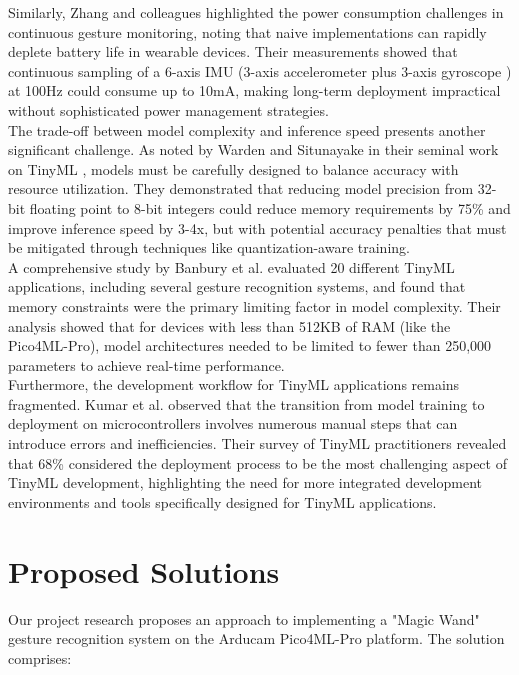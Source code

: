 Similarly, Zhang and colleagues \cite{Fan:2023} highlighted the power consumption challenges in continuous gesture monitoring, noting that naive implementations can rapidly deplete battery life in wearable devices. Their measurements showed that continuous sampling of a 6-axis IMU  (3-axis accelerometer plus 3-axis gyroscope ) at 100Hz could consume up to 10mA, making long-term deployment impractical without sophisticated power management strategies.\cite{Bistrov:2012}\\

The trade-off between model complexity and inference speed presents another significant challenge. As noted by Warden and Situnayake \cite{Warden:2020} in their seminal work on TinyML , models must be carefully designed to balance accuracy with resource utilization. They demonstrated that reducing model precision from 32-bit floating point to 8-bit integers could reduce memory requirements by 75\% and improve inference speed by 3-4x, but with potential accuracy penalties that must be mitigated through techniques like quantization-aware training.\\

A comprehensive study by Banbury et al. \cite{Banbury:2020} evaluated 20 different TinyML applications, including several gesture recognition systems, and found that memory constraints were the primary limiting factor in model complexity. Their analysis showed that for devices with less than 512KB of RAM (like the Pico4ML-Pro), model architectures needed to be limited to fewer than 250,000 parameters to achieve real-time performance.\\

Furthermore, the development workflow for TinyML applications remains fragmented. Kumar et al. \cite{Sadiq:2022} observed that the transition from model training to deployment on microcontrollers involves numerous manual steps that can introduce errors and inefficiencies. Their survey of TinyML practitioners revealed that 68\% considered the deployment process to be the most challenging aspect of TinyML development, highlighting the need for more integrated development environments and tools specifically designed for TinyML applications.\\

\section{Proposed Solutions}
Our project research proposes an approach to implementing a "Magic Wand" gesture recognition system on the Arducam Pico4ML-Pro platform. The solution comprises:

